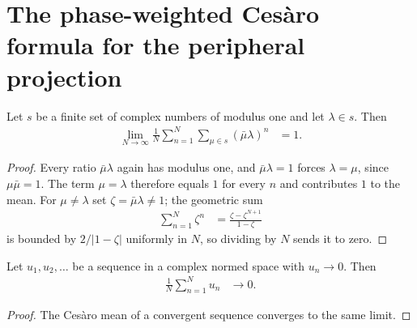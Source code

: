 \section{The phase-weighted Ces\`aro formula for the peripheral projection}

\begin{lemma}
    \label{lem:unit_modulus_phase_cesaro}
    \leanok
    Let $s$ be a finite set of complex numbers of modulus one and let
    $\lambda\in s$. Then
    \begin{align}
        \lim_{N\to\infty}\frac{1}{N}\sum_{n=1}^{N}\sum_{\mu\in s}
        (\bar\mu\lambda)^{n}
         & =1.
        \label{eq:unit_modulus_phase_cesaro}
    \end{align}
\end{lemma}

\begin{proof}\leanok
    Every ratio $\bar\mu\lambda$ again has modulus one, and
    $\bar\mu\lambda=1$ forces $\lambda=\mu$, since $\mu\bar\mu=1$. The term
    $\mu=\lambda$ therefore equals $1$ for every $n$ and contributes $1$ to
    the mean. For $\mu\neq\lambda$ set $\zeta=\bar\mu\lambda\neq1$; the
    geometric sum
    \begin{align}
        \sum_{n=1}^{N}\zeta^{n}
         & =\frac{\zeta-\zeta^{N+1}}{1-\zeta}
    \end{align}
    is bounded by $2/\lvert1-\zeta\rvert$ uniformly in $N$, so dividing by
    $N$ sends it to zero.
\end{proof}

\begin{lemma}
    \label{lem:cesaro_mean_of_null_sequence}
    \leanok
    Let $u_{1},u_{2},\dots$ be a sequence in a complex normed space with
    $u_{n}\to0$. Then
    \begin{align}
        \frac{1}{N}\sum_{n=1}^{N}u_{n}
         & \longrightarrow0.
    \end{align}
\end{lemma}

\begin{proof}\leanok
    The Ces\`aro mean of a convergent sequence converges to the same limit.
\end{proof}


